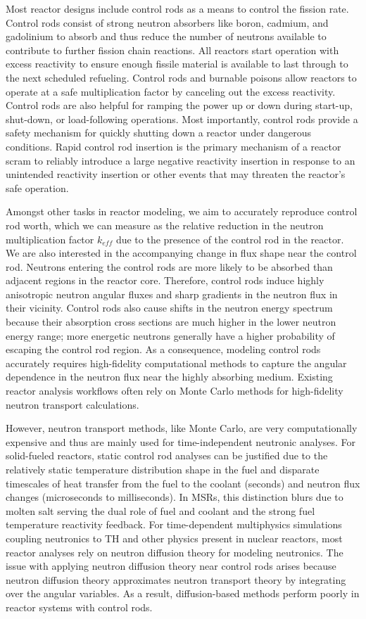Most reactor designs include control rods as a means to control the fission rate. Control rods
consist of strong
neutron absorbers like boron, cadmium, and gadolinium to absorb and thus reduce the number of
neutrons available to contribute to further fission chain reactions. All reactors start operation
with excess reactivity to ensure enough fissile material is available to last through to the next
scheduled refueling. Control rods and burnable poisons allow reactors to operate at a safe
multiplication factor by canceling out the excess reactivity. Control rods are also helpful
for ramping the power up or down during start-up, shut-down, or load-following operations. Most
importantly, control rods provide a safety mechanism for quickly shutting down a reactor under
dangerous conditions. Rapid control rod insertion is the primary mechanism of a reactor scram to
reliably introduce a large negative reactivity insertion in response to an unintended reactivity
insertion or other events that may threaten the reactor's safe operation. 

Amongst other tasks in reactor modeling, we aim to accurately reproduce control rod worth, which we
can measure as the relative reduction
in the neutron multiplication factor $k_{eff}$ due to the presence of the control rod in the
reactor. We are also interested in the accompanying change in flux shape near the
control rod. Neutrons entering the control rods are more likely to be absorbed than
adjacent regions in the reactor core. Therefore, control rods induce highly anisotropic neutron
angular fluxes and sharp gradients in the neutron flux in their vicinity. Control rods also cause
shifts in the neutron energy spectrum because their absorption cross sections are much higher in
the lower neutron energy range; more energetic neutrons generally have a higher probability of
escaping the control rod region. As a consequence, modeling control rods accurately requires
high-fidelity computational methods to capture the angular dependence in the neutron
flux near the highly absorbing medium. Existing reactor analysis workflows often rely on Monte
Carlo methods for high-fidelity neutron transport calculations.

However, neutron transport methods, like Monte Carlo, are very computationally expensive
and thus are mainly used for time-independent neutronic analyses. For solid-fueled reactors,
static control rod analyses can be justified due to the relatively static temperature distribution
shape in the fuel and disparate timescales of heat transfer from the fuel to
the coolant (seconds) and neutron flux changes (microseconds to milliseconds). In
\glspl{MSR}, this distinction blurs due to molten salt serving the dual role of fuel and
coolant and the strong fuel temperature reactivity feedback. For time-dependent multiphysics
simulations coupling neutronics to \gls{TH} and other physics present in nuclear reactors, most
reactor analyses rely on neutron diffusion theory for modeling neutronics. The issue with applying
neutron diffusion theory near control rods arises because neutron diffusion theory approximates
neutron transport theory by integrating over the angular variables. As a result, diffusion-based
methods perform poorly in reactor systems with control rods.

